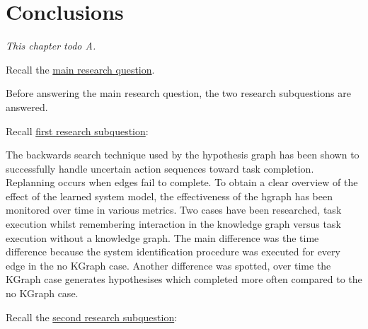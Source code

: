 \chapter{Conclusions}%
\label{chap:conclusion}
\textit{This chapter todo A.\bs}

Recall the \hyperref[researchquestion:main]{main research question}. \vspace{0.5\baselineskip}\\
\textit{\indent{}}\vspace{\baselineskip}

\noindent Before answering the main research question, the two research subquestions are answered.\vspace{\baselineskip}

\noindent Recall \hyperref[researchsubquestion:does_it_work]{first research subquestion}:\vspace{0.5\baselineskip}\\
\textit{\indent{}}\vspace{0.5\baselineskip}

\noindent The backwards search technique used by the hypothesis graph has been shown to successfully handle uncertain action sequences toward task completion. Replanning occurs when edges fail to complete. To obtain a clear overview of the effect of the learned system model, the effectiveness of the hgraph has been monitored over time in various metrics. Two cases have been researched, task execution whilst remembering interaction in the knowledge graph versus task execution without a knowledge graph. The main difference was the time difference because the system identification procedure was executed for every edge in the no KGraph case. Another difference was spotted, over time the KGraph case generates hypothesises which completed more often compared to the no KGraph case. \vspace{\baselineskip}


\noindent Recall the \hyperref[researchsubquestion:does_it_compare]{second research subquestion}:\vspace{0.5\baselineskip}\\
\textit{}\vspace{0.5\baselineskip}

